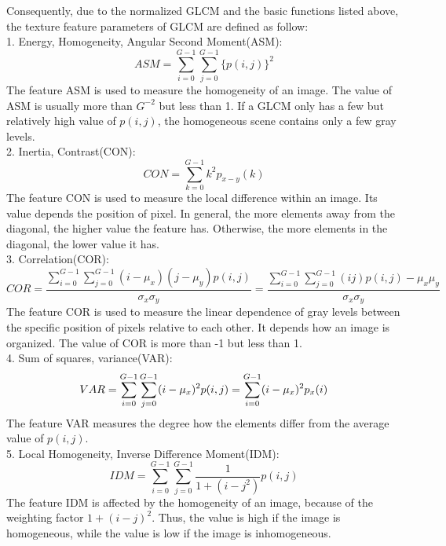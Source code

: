 Consequently, due to the normalized GLCM and the basic functions listed above, the texture feature parameters of GLCM are defined as follow\cite{Haralick}:\\
1. Energy, Homogeneity, Angular Second Moment(ASM): 
\begin{equation}
ASM = \sum_{i=0}^{G-1}\sum_{j=0}^{G-1}\{p(i,j)\}^2
\end{equation}
The feature ASM is used to measure the homogeneity of an image\cite{Peng}. The value of ASM is usually more than $G^{-2}$ but less than 1. If a GLCM only has a few but relatively high value of $p(i,j)$, the homogeneous scene contains only a few gray levels\cite{Albregtsen}.\\
2. Inertia, Contrast(CON):
\begin{equation}
CON = \sum_{k=0}^{G-1}k^2p_{x-y}(k)
\end{equation}
The feature CON is used to measure the local difference within an image. Its value depends the position of pixel. In general, the more elements away from the diagonal, the higher value the feature has. Otherwise, the more elements in the diagonal, the lower value it has.\\ 
3. Correlation(COR):
\begin{equation}
COR = \frac{\sum_{i=0}^{G-1}\sum_{j=0}^{G-1}(i-\mu_x)(j-\mu_y)p(i,j)}{\sigma_x\sigma_y} = \frac{\sum_{i=0}^{G-1}\sum_{j=0}^{G-1}(ij)p(i,j)-\mu_x\mu_y}{\sigma_x\sigma_y}
\end{equation}
The feature COR is used to measure the linear dependence of gray levels between the specific position of pixels relative to each other. It depends how an image is organized. The value of COR is more than -1 but less than 1.\\
4. Sum of squares, variance(VAR):
\begin{equation}
VAR = \sum_{i=0}^{G-1}\sum_{j=0}^{G-1}(i-\mu_x)^2p(i,j) \\
    = \sum_{i=0}^{G-1}(i-\mu_x)^2p_x(i)
\end{equation}
The feature VAR measures the degree how the elements differ from the average value of $p(i,j)$. \\
5. Local Homogeneity, Inverse Difference Moment(IDM):
\begin{equation}
IDM = \sum_{i=0}^{G-1}\sum_{j=0}^{G-1}\frac{1}{1+(i-j^2)}p(i,j)
\end{equation}
The feature IDM is affected by the homogeneity of an image, because of the weighting factor $1+(i - j)^2$. Thus, the value is high if the image is homogeneous, while the value is low if the image is inhomogeneous.\\
